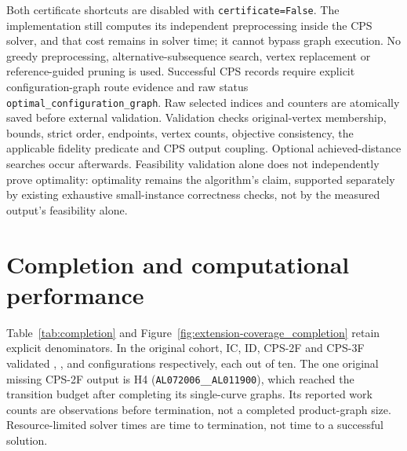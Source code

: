 Both certificate shortcuts are disabled with \texttt{certificate=False}. The implementation still computes its independent preprocessing inside the CPS solver, and that cost remains in solver time; it cannot bypass graph execution. No greedy preprocessing, alternative-subsequence search, vertex replacement or reference-guided pruning is used. Successful CPS records require explicit configuration-graph route evidence and raw status \texttt{optimal\_configuration\_graph}. Raw selected indices and counters are atomically saved before external validation. Validation checks original-vertex membership, bounds, strict order, endpoints, vertex counts, objective consistency, the applicable fidelity predicate and CPS output coupling. Optional achieved-distance searches occur afterwards. Feasibility validation alone does not independently prove optimality: optimality remains the algorithm's claim, supported separately by existing exhaustive small-instance correctness checks, not by the measured output's feasibility alone.

\section{Completion and computational performance}
Table~\ref{tab:completion} and Figure~\ref{fig:extension-coverage_completion} retain explicit denominators. In the original cohort, IC, ID, CPS-2F and CPS-3F validated \ValidIC{}, \ValidID{}, \ValidTwoF{} and \ValidThreeF{} configurations respectively, each out of ten. The one original missing CPS-2F output is H4 (\texttt{AL072006\_\_AL011900}), which reached the transition budget after completing its single-curve graphs. Its reported work counts are observations before termination, not a completed product-graph size. Resource-limited solver times are time to termination, not time to a successful solution.


